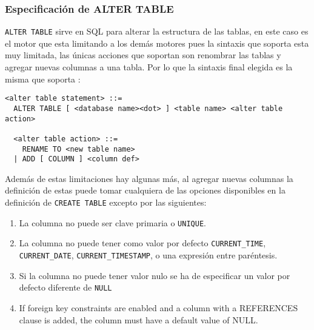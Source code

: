 \subsubsection{Especificación de ALTER TABLE} 
\label{especificacion:dialectos:altertable}
\verb=ALTER TABLE= sirve en SQL para alterar la estructura de las tablas, en este caso \s es el motor que esta limitando a los demás motores pues la sintaxis que soporta esta muy limitada, las únicas acciones que soportan son renombrar las tablas y agregar nuevas columnas a una tabla. Por lo que la sintaxis final elegida es la misma que soporta \s:
%
%  
\begin{Verbatim}[frame=single, label=sintaxis para ALTER TABLE]
  <alter table statement> ::= 
  ALTER TABLE [ <database name><dot> ] <table name> <alter table action>
  
  <alter table action> ::=
    RENAME TO <new table name>
  | ADD [ COLUMN ] <column def>
\end{Verbatim}
%
Además de estas limitaciones hay algunas más, al agregar nuevas columnas la definición de estas puede tomar cualquiera de las opciones disponibles en la definición de \verb=CREATE TABLE= excepto por las siguientes:
%
\begin{enumerate}
%
\item La columna no puede ser clave primaria o \verb=UNIQUE=.
%
\item La columna no puede tener como valor por defecto \verb=CURRENT_TIME=, \verb=CURRENT_DATE=, \verb=CURRENT_TIMESTAMP=, o una expresión entre paréntesis.
%
\item Si la columna no puede tener valor nulo se ha de especificar un valor por defecto diferente de \verb=NULL=
%
\item If foreign key constraints are enabled and a column with a REFERENCES clause is added, the column must have a default value of NULL.
%
\end{enumerate}
%
%
%
